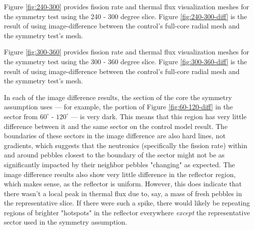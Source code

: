 Figure \ref{fig:240-300} provides fission rate and thermal flux visualization meshes for the symmetry test using the 240 - 300 degree slice.  Figure \ref{fig:240-300-diff} is the result of using image-difference between the control's full-core radial mesh and the symmetry test's mesh.




Figure \ref{fig:300-360} provides fission rate and thermal flux visualization meshes for the symmetry test using the 300 - 360 degree slice.  Figure \ref{fig:300-360-diff} is the result of using image-difference between the control's full-core radial mesh and the symmetry test's mesh.


In each of the image difference results, the section of the core the symmetry assumption  uses --- for example, the portion of Figure \ref{fig:60-120-diff} in the sector from $60^{\circ}$ - $120^{\circ}$ --- is very dark.  This means that this region has very little difference between it and the same sector on the control model result.  The boundaries of these sectors in the image difference are also hard lines, not gradients, which suggests that the neutronics (specifically the fission rate) within and around pebbles closest to the boundary of the sector might not be as significantly impacted by their neighbor pebbles "changing" as expected.  The image difference results also show very little difference in the reflector region, which makes sense, as the reflector is uniform.  However, this does indicate that there wasn't a local peak in thermal flux due to, say, a mass of fresh pebbles in the representative slice.  If there were such a spike, there would likely be repeating regions of brighter "hotspots" in the reflector everywhere \emph{except} the representative sector used in the symmetry assumption.